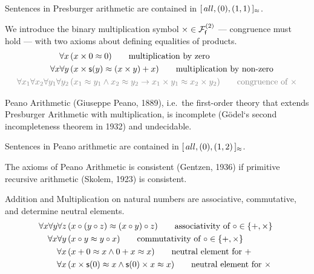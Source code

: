 \begin{remark}
	Sentences in Presburger arithmetic are contained in
	\( [ \, all , (0), (1,1) \, ]{}_{\mEQ} \).
\end{remark}

\begin{definition}
	[Multiplication]\label{tab:addition:axioms}
	We introduce the binary multiplication symbol \( \times\in\mcFfn[2] \)
	--- congruence must hold ---
	with two axioms about defining equalities of products.
	\begin{align*}
	\forall x\,
	&(x\times 0 \mEQ 0)
	\tag*{multiplication by zero}\\
	\forall x\forall y\,
	&(x\times\msucc(y) \mEQ (x\times y) + x)
	\tag*{multiplication by non-zero}
	\\
	\colG\forall x_1\forall x_2\forall y_1\forall y_2\,
	&\colG (x_1\mEQ y_1\land x_2\mEQ y_2 \limp x_1\times y_1\mEQ x_2 \times y_2)
	\tag*{congruence of \( \times \)}
	\end{align*}
\end{definition}

\begin{theorem}Peano Arithmetic (Giuseppe Peano, 1889),
	i.e.\ the first-order theory that extends Presburger Arithmetic with multiplication, is incomplete (Gödel`s second incompleteness theorem in 1932) and undecidable.
\end{theorem}

\begin{remark}
	Sentences in Peano arithmetic are contained in
	\( [ \, all , (0), (1,2) \, ]{}_{\mEQ} \).
\end{remark}

\begin{theorem}
	The axioms of Peano Arithmetic is consistent (Gentzen, 1936)
	if primitive recursive arithmetic (Skolem, 1923) is consistent.
\end{theorem}

\begin{lemma}[ACN]\label{lem:acn}
	Addition and Multiplication on natural numbers are associative, commutative,
	and determine neutral elements.
	\begin{align*}
	\forall x\forall y\forall z\,&(x\circ(y\circ z) \mEQ (x\circ y)\circ z)
	\tag*{associativity of \( \circ\in \{ +,\times \} \) }
	\\
	\forall x\forall y\,&(x\circ y \mEQ y\circ x)
	\tag*{commutativity of \( \circ\in \{ +, \times \} \)}
	\\
	\forall x\,&(x + 0\mEQ x \land 0 + x \mEQ x )
	\tag*{neutral element for \( + \)}
	\\
	\forall x\,&(x \times \msucc(0)\mEQ x \land \msucc(0) \times x \mEQ x )
	\tag*{neutral element for \( \times \)}
	\end{align*}
\end{lemma}

